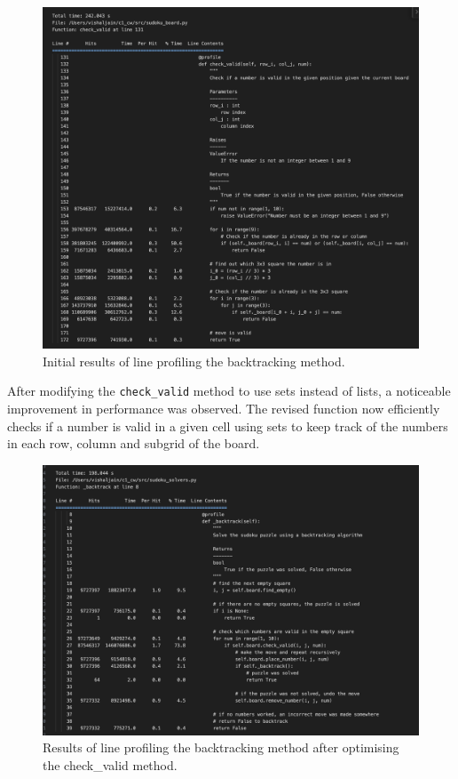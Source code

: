 \documentclass[11pt]{article}
\begin{document}
\begin{figure}[H]
    \centering
    \includegraphics[width=1\textwidth]{figs/check_valid_before.png}
    \caption{Initial results of line profiling the backtracking method.}
    \label{fig:line_profiling_check_valid_initial}
\end{figure}


After modifying the \texttt{check\_valid} method to use sets instead of lists, a noticeable improvement in performance was observed. The revised function now efficiently checks if a number is valid in a given cell using sets to keep track of the numbers in each row, column and subgrid of the board. 

\begin{figure}
    \centering
    \includegraphics[width=1\textwidth]{figs/bt_line_profile_after.png}
    \caption{Results of line profiling the backtracking method after optimising the check\_valid method.}
    \label{fig:line_profiling_bt_after}
\end{figure}
\end{document}
